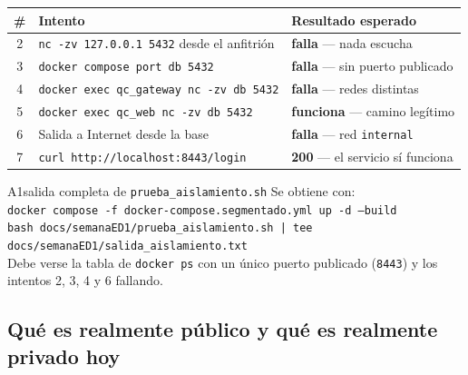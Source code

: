 \documentclass[11pt,letterpaper]{article}
\begin{document}
\begin{center}
\small
\begin{tabular}{@{}c >{\raggedright\arraybackslash}p{8.3cm} >{\raggedright\arraybackslash}p{4.3cm}@{}}
\toprule
\textbf{\#} & \textbf{Intento} & \textbf{Resultado esperado} \\
\midrule
2 & \texttt{nc -zv 127.0.0.1 5432} desde el anfitrión & \textcolor{qcRed}{\textbf{falla}} — nada escucha \\
3 & \texttt{docker compose port db 5432} & \textcolor{qcRed}{\textbf{falla}} — sin puerto publicado \\
4 & \texttt{docker exec qc\_gateway nc -zv db 5432} & \textcolor{qcRed}{\textbf{falla}} — redes distintas \\
5 & \texttt{docker exec qc\_web nc -zv db 5432} & \textcolor{qcGreen}{\textbf{funciona}} — camino legítimo \\
6 & Salida a Internet desde la base & \textcolor{qcRed}{\textbf{falla}} — red \texttt{internal} \\
7 & \texttt{curl http://localhost:8443/login} & \textcolor{qcGreen}{\textbf{200}} — el servicio sí funciona \\
\bottomrule
\end{tabular}
\end{center}

\begin{captura}{A1}{salida completa de \texttt{prueba\_aislamiento.sh}}
\vspace{2.6cm}
\footnotesize
Se obtiene con:\\[2pt]
\texttt{docker compose -f docker-compose.segmentado.yml up -d --build}\\
\texttt{bash docs/semanaED1/prueba\_aislamiento.sh | tee docs/semanaED1/salida\_aislamiento.txt}\\[4pt]
Debe verse la tabla de \texttt{docker ps} con un único puerto publicado
(\texttt{8443}) y los intentos 2, 3, 4 y 6 fallando.
\vspace{2.6cm}
\end{captura}

\subsection{Qué es realmente público y qué es realmente privado hoy}
\end{document}
